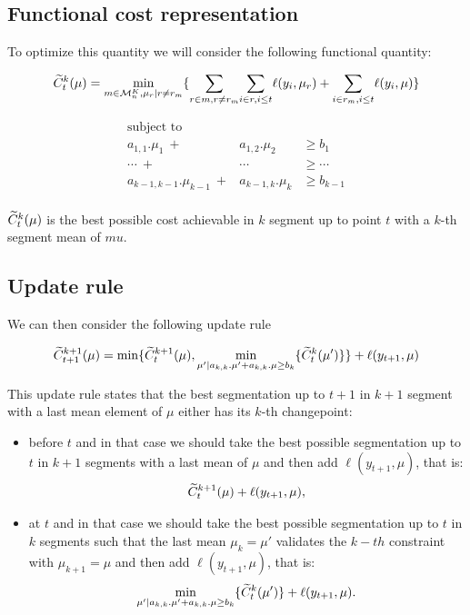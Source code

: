 \documentclass{article}
\begin{document}
\subsection{Functional cost representation}
To optimize this quantity we will consider the following functional quantity:

\begin{equation}
\widetilde{C}^k_t(\mu) =  \underset{m \in \mathcal{M}^K_n, \mu_r |  r \neq r_m}{\min} 
		\{ 
		   \underset{r \in m, r \neq r_m}{\sum} 
		   \underset{i \in r, i \leq t  }{\sum} \ell(y_i, \mu_{r}) 
		+ 
		   \underset{i \in r_m, i \leq t}{\sum} \ell(y_i, \mu)
		\}  
\end{equation}



\begin{eqnarray*}
\text{subject to} \\
a_{1,1}. \mu_1 \ + & a_{1,2}. \mu_2  & \geq  b_1 \\
\cdots \ + & \cdots & \geq \cdots \\
a_{k-1,k-1}. \mu_{k-1} \ + &a_{k-1,k}. \mu_{k}  & \geq  b_{k-1} \\
\end{eqnarray*}

$\widetilde{C}^k_t(\mu)$ is the best possible cost achievable in $k$ segment up to point $t$ with a $k$-th
segment mean of $mu$.

\subsection{Update rule}
We can then consider the following update rule

\begin{equation}
\widetilde{C}^{k+1}_{t+1}(\mu) = \min \{ \widetilde{C}^{k+1}_{t}(\mu)  , \underset{\mu' | a_{k,k}. \mu' + a_{k,k}. \mu  \geq  b_{k}}{\min} \{ \widetilde{C}^{k}_{t}(\mu') \}  \} + \ell(y_{t+1}, \mu)
\end{equation}

This update rule states that the best segmentation up to $t+1$ in $k+1$ segment with a last mean element of $\mu$ either has its $k$-th changepoint:
\begin{itemize}
\item before $t$ and in that case we should take the best possible segmentation up to $t$ in $k+1$
segments with a last mean of $\mu$ and then add  $\ell(y_{t+1}, \mu)$, that is:
$$\widetilde{C}^{k+1}_{t}(\mu) + \ell(y_{t+1}, \mu),$$

\item at $t$ and in that case we should take the best possible segmentation up to $t$ in $k$ segments
such that the last mean $\mu_k=\mu'$ validates the $k-th$ constraint with $\mu_{k+1}=\mu$ and then add  $\ell(y_{t+1}, \mu)$, that is:
 $$\underset{\mu' | a_{k,k}. \mu' + a_{k,k}. \mu  \geq  b_{k}}{\min} \{ \widetilde{C}^{k}_{t}(\mu') \} + \ell(y_{t+1}, \mu).$$
\end{itemize}
\end{document}
